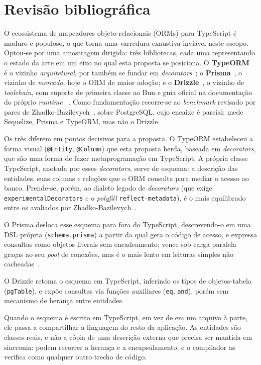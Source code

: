 \newpage
\section{Revisão bibliográfica}
\label{sc:revisao}

O ecossistema de mapeadores objeto-relacionais (ORMs) para TypeScript é maduro e populoso, o que torna uma varredura exaustiva inviável neste escopo. Optou-se por uma amostragem dirigida: três bibliotecas, cada uma representando o estado da arte em um eixo no qual esta proposta se posiciona. O \textbf{TypeORM}~\cite{typeorm} é o vizinho \emph{arquitetural}, por também se fundar em \emph{decorators}~\cite{tc39-decorators}; o \textbf{Prisma}~\cite{prisma}, o vizinho de \emph{mercado}, hoje o ORM de maior adoção; e o \textbf{Drizzle}~\cite{drizzle}, o vizinho de \emph{toolchain}, com suporte de primeira classe ao Bun e guia oficial na documentação do próprio \emph{runtime} ~\cite{bun-drizzle}. Como fundamentação recorre-se ao \emph{benchmark} revisado por pares de Zhadko-Bazilevych~\cite{jcsi2025}, sobre PostgreSQL, cujo encaixe é parcial: mede Sequelize, Prisma e TypeORM, mas não o Drizzle.

Os três diferem em pontos decisivos para a proposta. O TypeORM estabeleceu a forma visual (\texttt{@Entity}, \texttt{@Column}) que esta proposta herda, baseada em \emph{decorators}, que são uma forma de fazer metaprogramação em TypeScript. A própria classe TypeScript, anotada por esses \emph{decorators}, serve de esquema: a descrição das entidades, suas colunas e relações que o ORM consulta para mediar o acesso ao banco. Prende-se, porém, ao dialeto legado de \emph{decorators} (que exige \texttt{experimentalDecorators} e o \emph{polyfill} \texttt{reflect-metadata}), é o mais equilibrado entre os avaliados por Zhadko-Bazilevych~\cite{jcsi2025}. 

O Prisma desloca esse esquema para fora do TypeScript, descrevendo-o em uma DSL própria (\texttt{schema.prisma}) a partir da qual gera o código de acesso, e expressa consultas como objetos literais sem encadeamento; vence sob carga paralela graças ao seu \emph{pool} de conexões, mas é o mais lento em leituras simples não cacheadas~\cite{jcsi2025}. 

O Drizzle retoma o esquema em TypeScript, inferindo os tipos de objetos-tabela (\texttt{pgTable}), e expõe consultas via funções auxiliares (\texttt{eq}, \texttt{and}), porém sem mecanismo de herança entre entidades.

Quando o esquema é escrito em TypeScript, em vez de em um arquivo à parte, ele passa a compartilhar a linguagem do resto da aplicação. As entidades são classes reais, e não a cópia de uma descrição externa que precisa ser mantida em sincronia: podem recorrer a herança e a encapsulamento, e o compilador as verifica como qualquer outro trecho de código.

